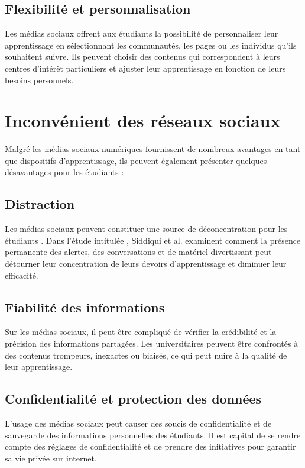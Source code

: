 \documentclass[12pt,a4paper,titlepage]{article}
\begin{document}
\subsection{Flexibilité et personnalisation }
Les médias sociaux offrent aux étudiants la possibilité de personnaliser leur apprentissage en sélectionnant les communautés, les pages ou les individus qu'ils souhaitent suivre. Ils peuvent choisir des contenus qui correspondent à leurs centres d'intérêt particuliers et ajuster leur apprentissage en fonction de leurs besoins personnels.
\section{Inconvénient des réseaux sociaux }
Malgré les médias sociaux numériques fournissent de nombreux avantages en tant que dispositifs d'apprentissage, ils peuvent également présenter quelques désavantages pour les étudiants :\\


\subsection{Distraction }
 Les médias sociaux peuvent constituer une source de déconcentration pour les étudiants . Dans l'étude intitulée \citep{siddiqui2016social}, Siddiqui et al. examinent comment la présence permanente des alertes, des conversations et de matériel divertissant peut détourner leur concentration de leurs devoirs d'apprentissage et diminuer leur efficacité. 
 
 
 
 \subsection{Fiabilité des informations }
 Sur les médias sociaux, il peut être compliqué de vérifier la crédibilité et la précision des informations partagées. Les universitaires peuvent être confrontés à des contenus trompeurs, inexactes ou biaisés, ce qui peut nuire à la qualité de leur apprentissage.
 
 
 \subsection{Confidentialité et protection des données }
 L'usage des médias sociaux peut causer des soucis de confidentialité et de sauvegarde des informations personnelles des étudiants. Il est capital de se rendre compte des réglages de confidentialité et de prendre des initiatives pour garantir sa vie privée sur internet.
\end{document}
